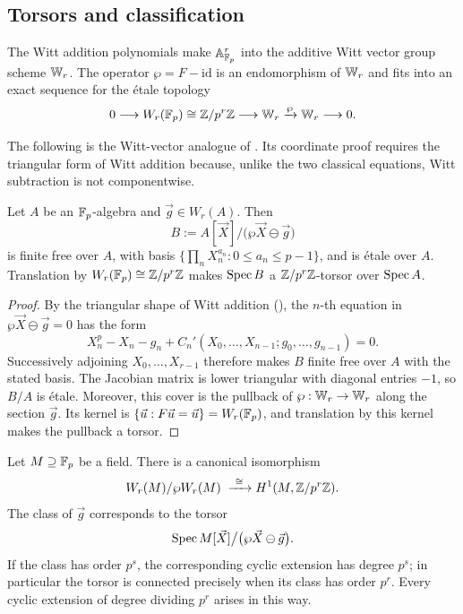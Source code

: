 \subsection{Torsors and classification}

The Witt addition polynomials make $\mathbb{A}^r_{\mathbb{F}_p}$ into the additive Witt
vector group scheme $\mathbb{W}_r$. The operator $\wp=F-\mathrm{id}$ is an
endomorphism of $\mathbb{W}_r$ and fits into an exact sequence for the \'etale
topology
\begin{equation}\label{eq:asw_lang_sequence}
0\longrightarrow W_r(\mathbb{F}_p)\cong\mathbb{Z}/p^r\mathbb{Z}
\longrightarrow\mathbb{W}_r\xrightarrow{\wp}\mathbb{W}_r\longrightarrow0.
\end{equation}

The following is the Witt-vector analogue of
. Its coordinate proof
requires the triangular form of Witt addition because, unlike the two
classical equations, Witt subtraction is not componentwise.

\begin{lemma}
\label{lemma:asw_etale_torsor}
Let $A$ be an $\mathbb{F}_p$-algebra and $\vec g\in W_r(A)$. Then
\[
B:=A[\vec X]\big/\bigl(\wp\vec X\ominus\vec g\bigr)
\]
is finite free over $A$, with basis
$\{\prod_nX_n^{a_n}:0\leq a_n\leq p-1\}$, and is \'etale over $A$.
Translation by $W_r(\mathbb{F}_p)\cong\mathbb{Z}/p^r\mathbb{Z}$ makes $\operatorname{Spec} B$ a
$\mathbb{Z}/p^r\mathbb{Z}$-torsor over $\operatorname{Spec} A$.
\end{lemma}

\begin{proof}
By the triangular shape of Witt addition
(), the $n$-th equation in
$\wp\vec X\ominus\vec g=0$ has the form
\[
X_n^p-X_n-g_n+C_n'(X_0,\dots,X_{n-1};g_0,\dots,g_{n-1})=0.
\]
Successively adjoining $X_0,\dots,X_{r-1}$ therefore makes $B$ finite free
over $A$ with the stated basis. The Jacobian matrix is lower triangular with
diagonal entries $-1$, so $B/A$ is \'etale. Moreover, this cover is the
pullback of $\wp:\mathbb{W}_r\to\mathbb{W}_r$ along the section $\vec g$. Its kernel is
$\{\vec u:F\vec u=\vec u\}=W_r(\mathbb{F}_p)$, and translation by this kernel makes
the pullback a torsor.
\end{proof}

\begin{theorem}
\label{theorem:asw_theory}
Let $M\supseteq\mathbb{F}_p$ be a field. There is a canonical isomorphism
\[
W_r(M)/\wp W_r(M)\;\xrightarrow{\ \cong\ }
H^1(M,\mathbb{Z}/p^r\mathbb{Z}).
\]
The class of $\vec g$ corresponds to the torsor
\[
\operatorname{Spec} M[\vec X]\big/\bigl(\wp\vec X\ominus\vec g\bigr).
\]
If the class has order $p^s$, the corresponding cyclic extension has degree
$p^s$; in particular the torsor is connected precisely when its class has
order $p^r$. Every cyclic extension of degree dividing $p^r$ arises in this
way.
\end{theorem}

